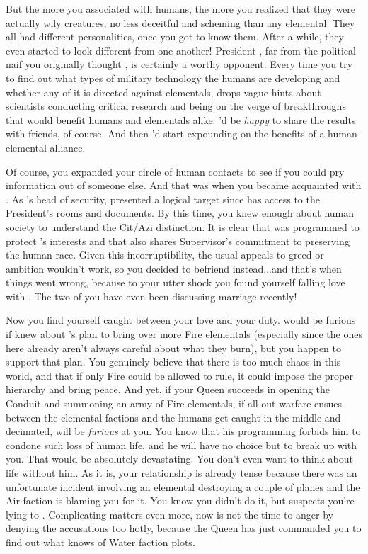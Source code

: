 \documentclass[char]{elementals}
\begin{document}
But the more you associated with humans, the more you realized that they were actually wily creatures, no less deceitful and scheming than any elemental.  They all had different personalities, once you got to know them.  After a while, they even started to look different from one another!  President \cLeader{}, far from the political naif you originally thought \cLeader{\them}, is certainly a worthy opponent.  Every time you try to find out what types of military technology the humans are developing and whether any of it is directed against elementals, \cLeader{\they} drops vague hints about \cLeader{\their} scientists conducting critical research and being on the verge of breakthroughs that would benefit humans and elementals alike.  \cLeader{\They}'d be \emph{happy} to share the results with \cLeader{\their} friends, of course.  And then \cLeader{\they}'d start expounding on the benefits of a human-elemental alliance.

Of course, you expanded your circle of human contacts to see if you could pry information out of someone else.  And that was when you became acquainted with \cRomeo{}.  As \cLeader{}'s head of security, \cRomeo{\they} presented a logical target since \cRomeo{\they} has access to the President's rooms and documents.  By this time, you knew enough about human society to understand the Cit/Azi distinction.  It is clear that \cRomeo{\they} was programmed to protect \cLeader{}'s interests and that \cRomeo{\they} also shares \cRomeo{\their} Supervisor's commitment to preserving the human race.  Given this incorruptibility, the usual appeals to greed or ambition wouldn't work, so you decided to befriend \cRomeo{\them} instead...and that's when things went wrong, because to your utter shock you found yourself falling love with \cRomeo{\them}.  The two of you have even been discussing marriage recently!  

Now you find yourself caught between your love and your duty.  \cRomeo{} would be furious if \cRomeo{\they} knew about \cQueen{}'s plan to bring over more Fire elementals (especially since the ones here already aren't always careful about what they burn), but you happen to support that plan. You genuinely believe that there is too much chaos in this world, and that if only Fire could be allowed to rule, it could impose the proper hierarchy and bring peace.  And yet, if your Queen succeeds in opening the Conduit and summoning an army of Fire elementals, if all-out warfare ensues between the elemental factions and the humans get caught in the middle and decimated, \cRomeo{} will be \emph{furious} at you.  You know that his programming forbids him to condone such loss of human life, and he will have no choice but to break up with you.  That would be absolutely devastating.  You don't even want to think about life without him.  As it is, your relationship is already tense because there was an unfortunate incident involving an elemental destroying a couple of planes and the Air faction is blaming you for it.  You know you didn't do it, but \cRomeo{} suspects you're lying to \cRomeo{\them}.  Complicating matters even more, now is not the time to anger \cKing{} by denying the accusations too hotly, because the Queen has just commanded you to find out what \cKing{\they} knows of Water faction plots.  
\end{document}
